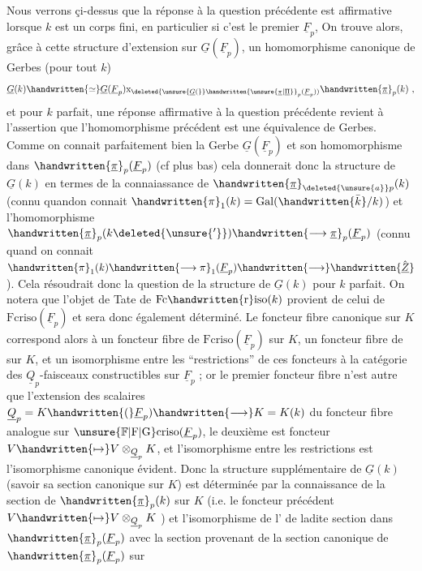  Nous verrons çi-dessus que la réponse à la question précédente est affirmative lorsque $k$ est un corps fini, en particulier si c'est le  premier $\underline{F}_p$, On trouve alors, grâce à cette structure d'extension sur $\underline{G}(\underline{F}_p)$, un homomorphisme canonique de Gerbes (pour tout $k$)
\[
\underline{G}(k)\handwritten{\simeq}\underline{G}(\underline{F}_p)\mathrm{x}_{\deleted{\unsure{\underline{G}(}}\handwritten{\unsure{\underline{\pi}|\underline{\Pi}}}_p(\underline{F}_p))}\handwritten{\underline{\pi}}_p(k)\ ,
\]
et pour $k$ parfait, une réponse affirmative à la question précédente revient à l'assertion que l'homomorphisme précédent est une équivalence de Gerbes. Comme on connait parfaitement bien la Gerbe $\underline{G}(\underline{F}_p)$ et son homomorphisme dans $\handwritten{\underline{\pi}}_p(\underline{F}_p)$ (cf plus bas) cela donnerait donc la structure de $\underline{G}(k)$ en termes de la connaiassance de  $\handwritten{\underline{\pi}}_{\deleted{\unsure{a}}p}(k)$ (connu quand\handwritten{\,}on connait $\handwritten{\pi}_1(k)=\operatorname{Gal}(\handwritten{\bar{k}}/k)$) et  l'homomorphisme $\handwritten{\underline{\pi}}_p(k\deleted{\unsure{'}})\handwritten{\longrightarrow\underline{\pi}}_p(\underline{F}_p)$ (connu quand on connait $\handwritten{\pi}_1(k)\handwritten{\longrightarrow\pi}_1(\underline{F}_p)\handwritten{\longrightarrow}\handwritten{\hat{\underline{Z}}}$). Cela résoudrait donc la question de la structure de $\underline{G}(k)$ pour $k$ parfait. On notera que l'objet de Tate de $\mathrm{Fc}\handwritten{\mathrm{r}}\mathrm{iso}(k)$ provient de celui de $\mathrm{Fcriso}(\underline{F}_p)$ et sera donc également déterminé. Le foncteur fibre canonique sur $K$ correspond alors à un foncteur fibre de $\mathrm{Fcriso}(\underline{F}_p)$ sur $K$, un foncteur fibre de  sur $K$, et un isomorphisme entre les ``restrictions'' de ces foncteurs à la catégorie des $\underline{Q}_p$-faisceaux constructibles sur $\underline{F}_p$ ; or le premier foncteur fibre n'est autre que  l'extension des scalaires $\underline{Q}_p=K\handwritten{(}\underline{F}_p)\handwritten{\longrightarrow}K=K(k)$ du foncteur fibre analogue sur $\unsure{\mathbb{F}|\mathrm{F}|\mathrm{G}}\mathrm{criso}(\underline{F}_p)$, le deuxième est  foncteur  $V\handwritten{\mapsto}V\otimes_{\underline{Q}_p}K$, et l'isomorphisme  entre les restrictions est l'isomorphisme canonique évident. Donc la structure supplémentaire de $\underline{G}(k)$ (savoir sa section  canonique sur $K$) est déterminée par la connaissance de la section de $\handwritten{\underline{\pi}}_p(k)$ sur $K$ (i.e. le foncteur précédent $V\handwritten{\mapsto}V\otimes_{\underline{Q}_p}K$ ) et l'isomorphisme de l' de ladite section dans $\handwritten{\underline{\pi}}_p(\underline{F}_p)$ avec la section provenant de la section canonique de $\handwritten{\underline{\pi}}_p(\underline{F}_p)$ sur 